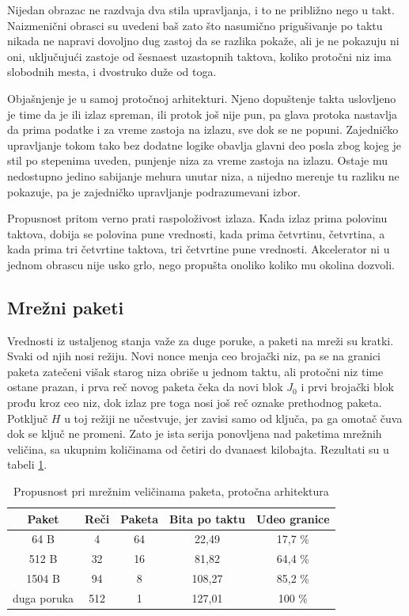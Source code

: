 Nijedan obrazac ne razdvaja dva stila upravljanja, i to ne približno nego u takt. Naizmenični obrasci su uvedeni baš zato što nasumično prigušivanje po taktu nikada ne napravi dovoljno dug zastoj da se razlika pokaže, ali je ne pokazuju ni oni, uključujući zastoje od šesnaest uzastopnih taktova, koliko protočni niz ima slobodnih mesta, i dvostruko duže od toga.

Objašnjenje je u samoj protočnoj arhitekturi. Njeno dopuštenje takta uslovljeno je time da je ili izlaz spreman, ili protok još nije pun, pa glava protoka nastavlja da prima podatke i za vreme zastoja na izlazu, sve dok se ne popuni. Zajedničko upravljanje tokom tako bez dodatne logike obavlja glavni deo posla zbog kojeg je stil po stepenima uveden, punjenje niza za vreme zastoja na izlazu. Ostaje mu nedostupno jedino sabijanje mehura unutar niza, a nijedno merenje tu razliku ne pokazuje, pa je zajedničko upravljanje podrazumevani izbor.

Propusnost pritom verno prati raspoloživost izlaza. Kada izlaz prima polovinu taktova, dobija se polovina pune vrednosti, kada prima četvrtinu, četvrtina, a kada prima tri četvrtine taktova, tri četvrtine pune vrednosti. Akcelerator ni u jednom obrascu nije usko grlo, nego propušta onoliko koliko mu okolina dozvoli.

\subsection{Mrežni paketi}
\label{subsec:rez_aes_kratki}

Vrednosti iz ustaljenog stanja važe za duge poruke, a paketi na mreži su kratki. Svaki od njih nosi režiju. Novi nonce menja ceo brojački niz, pa se na granici paketa zatečeni višak starog niza obriše u jednom taktu, ali protočni niz time ostane prazan, i prva reč novog paketa čeka da novi blok $J_0$ i prvi brojački blok prođu kroz ceo niz, dok izlaz pre toga nosi još reč oznake prethodnog paketa. Potključ $H$ u toj režiji ne učestvuje, jer zavisi samo od ključa, pa ga omotač čuva dok se ključ ne promeni. Zato je ista serija ponovljena nad paketima mrežnih veličina, sa ukupnim količinama od četiri do dvanaest kilobajta. Rezultati su u tabeli \ref{tab:aes_kratki}.

\begin{table}[H]
\caption{Propusnost pri mrežnim veličinama paketa, protočna arhitektura}
\centering
{\renewcommand{\arraystretch}{1.25}\setlength{\tabcolsep}{10pt}
\begin{tabular}{|c|c|c|c|c|}
\hline
\rowcolor{gray!30}
Paket & Reči & Paketa & Bita po taktu & Udeo granice \\
\hline
64 B    & 4   & 64 & 22,49  & 17,7 \% \\
\hline
512 B   & 32  & 16 & 81,82  & 64,4 \% \\
\hline
1504 B  & 94  & 8  & 108,27 & 85,2 \% \\
\hline
duga poruka & 512 & 1 & 127,01 & 100 \% \\
\hline
\end{tabular}
}
\label{tab:aes_kratki}
\end{table}

